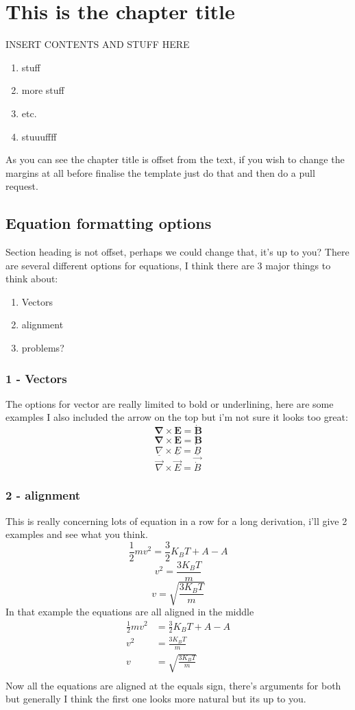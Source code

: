 \documentclass[11pt,oneside]{book}
\begin{document}
\chapter{This is the chapter title}
INSERT CONTENTS AND STUFF HERE
\begin{enumerate}
	\item stuff
	\item more stuff
	\item etc.
	\item stuuuffff
\end{enumerate}
\pagebreak
As you can see the chapter title is offset from the text, if you wish to change the margins at all before finalise the template just do that and then do a pull request.
%
\section{Equation formatting options}
Section heading is not offset, perhaps we could change that, it's up to you?
 There are several different options for equations, I think there are 3 major things to think about:
%
\begin{enumerate}
	\item Vectors
	\item alignment
	\item problems?
\end{enumerate}
%
\subsection{1 - Vectors}
The options for vector are really limited to bold or underlining, here are some examples I also included the arrow on the top but i'm not sure it looks too great:
%
$$\mathbf{\nabla}\times\mathbf{E} = \mathbf{\dot{B}}$$
%
$$\pmb{\nabla}\times\pmb{E} = \pmb{\dot{B}}$$
%
$$\underline{\nabla}\times\underline{E} = \underline{\dot{B}}$$
%
$$\vec{\nabla}\times\vec{E} = \vec{\dot{B}}$$
%
\subsection{2 - alignment}
This is really concerning lots of equation in a row for a long derivation, i'll give 2 examples and see what you think.
%
$$\frac{1}{2}mv^2=\frac{3}{2}K_BT + A - A$$
%
$$v^2=\frac{3K_BT}{m}$$
%
$$v=\sqrt{\frac{3K_BT}{m}}$$
%
In that example the equations are all aligned in the middle
%
\begin{align*}	
	\frac{1}{2}mv^2&=\frac{3}{2}K_BT + A - A\\
	v^2&=\frac{3K_BT}{m}\\
	v&=\sqrt{\frac{3K_BT}{m}}\\
\end{align*}
%
Now all the equations are aligned at the equals sign, there's arguments for both but generally I think the first one looks more natural but its up to you.
%
\end{document}
